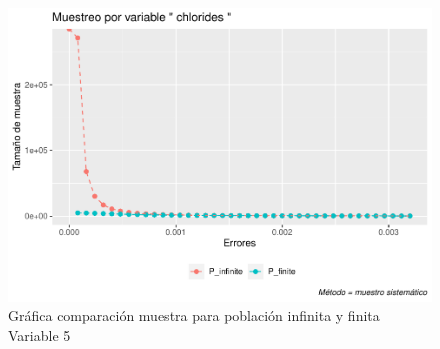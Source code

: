 \documentclass[
]{article}
\begin{document}
\begin{figure}
\centering
\includegraphics{1_examen_solucion_files/figure-latex/grafica sys5-1.pdf}
\caption{Gráfica comparación muestra para población infinita y finita
Variable 5}
\end{figure}
\end{document}
